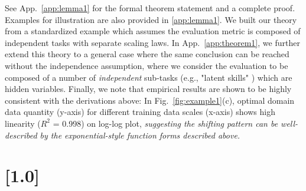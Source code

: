 \documentclass{article} %
\newcommand{\kang}[1]{\textbf{\textcolor{cyan}{[Feiyang: #1]}}}
\begin{document}
    See App.~\ref{app:lemma1} for the formal theorem statement and a complete proof. Examples for illustration are also provided in \ref{app:lemma1}. 
    We built our theory from a standardized example which assumes the evaluation metric is composed of independent tasks with separate scaling laws. In App.~\ref{app:theorem1}, we further extend this theory to a general case where the same conclusion can be reached without the independence assumption, where we consider the evaluation to be composed of a number of \textit{independent} sub-tasks (e.g., "latent skills" \citep{tiong2024toward}) which are hidden variables. Finally, we note that empirical results are shown to be highly consistent with the derivations above: In Fig.~\ref{fig:example1}(c), optimal domain data quantity (y-axis) for different training data scales (x-axis) shows high linearity ($R^2$ = 0.998) on log-log plot, \textit{suggesting the shifting pattern can be well-described by the exponential-style function forms described above.}

\vspace{-0.5em}
\section{\scalebox{0.96}[1.0]{}}
\label{sec:scaling}\vspace{-0.5em}

\end{document}
